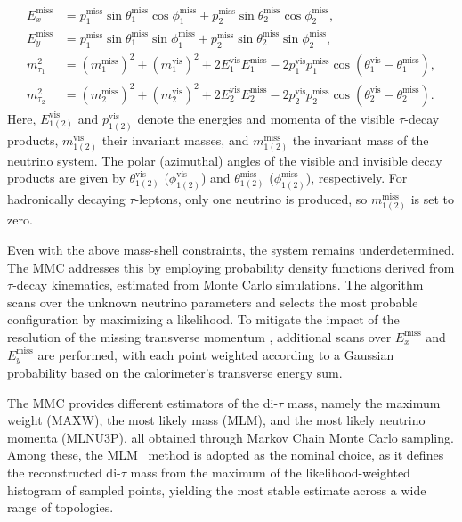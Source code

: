\begin{align}
E_x^{\text{miss}} &= p_1^{\text{miss}} \sin \theta^{\text{miss}}_1 \cos \phi^{\text{miss}}_1 + p_2^{\text{miss}} \sin \theta^{\text{miss}}_2 \cos \phi^{\text{miss}}_2 , \nonumber \\
E_y^{\text{miss}} &= p_1^{\text{miss}} \sin \theta^{\text{miss}}_1 \sin \phi^{\text{miss}}_1 + p_2^{\text{miss}} \sin \theta^{\text{miss}}_2 \sin \phi^{\text{miss}}_2 , \nonumber \\
m_{\tau_1}^2 &= \left(m_1^{\text{miss}}\right)^2 + \left(m_1^{\text{vis}}\right)^2 + 2 E_1^{\text{vis}} E_1^{\text{miss}}
- 2 p_1^{\text{vis}} p_1^{\text{miss}} \cos\left(\theta_1^{\text{vis}} - \theta_1^{\text{miss}}\right) ,  \nonumber \\
m_{\tau_2}^2 &= \left(m_2^{\text{miss}}\right)^2 + \left(m_2^{\text{vis}}\right)^2 + 2 E_2^{\text{vis}} E_2^{\text{miss}}
- 2 p_2^{\text{vis}} p_2^{\text{miss}} \cos\left(\theta_2^{\text{vis}} - \theta_2^{\text{miss}}\right) .
\end{align}
Here, $E^{\text{vis}}_{1(2)}$ and $p^{\text{vis}}_{1(2)}$ denote the energies and momenta of the visible $\tau$-decay products, $m^{\text{vis}}_{1(2)}$ their invariant masses, and $m^{\text{miss}}_{1(2)}$ the invariant mass of the neutrino system. The polar (azimuthal) angles of the visible and invisible decay products are given by $\theta^{\text{vis}}_{1(2)}$ ($\phi^{\text{vis}}_{1(2)}$) and $\theta^{\text{miss}}_{1(2)}$ ($\phi^{\text{miss}}_{1(2)}$), respectively. For hadronically decaying $\tau$-leptons, only one neutrino is produced, so $m^{\text{miss}}_{1(2)}$ is set to zero.  

Even with the above mass-shell constraints, the system remains underdetermined. The MMC addresses this by employing probability density functions derived from $\tau$-decay kinematics, estimated from Monte Carlo simulations. The algorithm scans over the unknown neutrino parameters and selects the most probable configuration by maximizing a likelihood. To mitigate the impact of the resolution of the missing transverse momentum \etmiss, additional scans over $E_x^{\text{miss}}$ and $E_y^{\text{miss}}$ are performed, with each point weighted according to a Gaussian probability based on the calorimeter’s transverse energy sum.  

The MMC provides different estimators of the di-$\tau$ mass, namely the maximum weight (MAXW), the most likely mass (MLM), and the most likely neutrino momenta (MLNU3P), all obtained through Markov Chain Monte Carlo sampling. Among these, the MLM~\cite{mlm_thesis} method is adopted as the nominal choice, as it defines the reconstructed di-$\tau$ mass from the maximum of the likelihood-weighted histogram of sampled points, yielding the most stable estimate across a wide range of topologies.  

